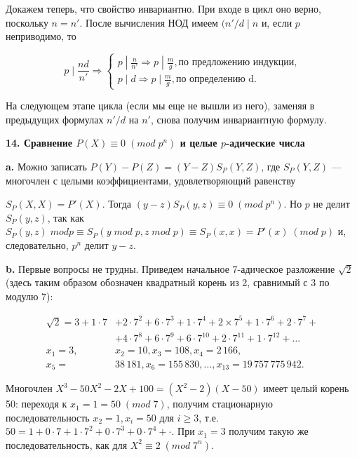 \documentclass{mai_book}
\begin{document}
Докажем теперь, что свойство инвариантно. При входе в цикл оно
верно, поскольку $n=n'$. После вычисления НОД имеем $(n'/d\; |\; n$ и,
если $p$ неприводимо, то

\begin{equation*}
p\;|\; \frac{nd}{n'}\Longrightarrow
 \begin{cases}
   p\;|\; \frac{n}{n'}\Rightarrow p\;|\; \frac{m}{g}, \text{по предложению индукции,}\\
   p\;|\; d\Rightarrow p\;|\; \frac{m}{g}, \text{по определению d.}
 \end{cases}
\end{equation*}


\noindent На следующем этапе цикла (если мы еще не вышли из него), заменяя в
предыдущих формулах $n'/d$ на $n'$, снова получим инвариантную фор­мулу.

\bigskip
\textbf{14. Сравнение $P(X)\equiv 0\; (mod\; p^n)$ и целые $p$-адические числа}

\medskip
\textbf{a.} Можно записать $P(Y)-P(Z)=(Y-Z)S_P(Y,Z)$, где $S_P(Y,Z)$ --- многочлен с целыми коэффициентами, удовлетворяющий равенству

\newpage


\noindent $S_P(X,X)=P'(X)$. Тогда $(y-z)S_P(y,z)\equiv 0\; (mod\; p^n)$. Но $p$ не делит $S_P(y,z)$, так как $S_P(y,z)\; mod p\equiv S_P(y\; mod\; p,z\; mod\; p)\equiv S_P(x,x)=P'(x)\;(mod\; p)$ и, следовательно, $p^n$ делит $y-z$.

\medskip
\textbf{b.} Первые вопросы не трудны. Приведем начальное 7-адическое
разложение $\sqrt{2}$ (здесь таким образом обозначен квадратный корень из 2, сравнимый с 3 по модулю 7):

$$
\begin{aligned}
\sqrt{2}=3+1\cdot 7&+2\cdot 7^2+6\cdot 7^3+1\cdot 7^4+2\times 7^5+1\cdot7^6+2\cdot 7^7+\\
&+4\cdot 7^8+6\cdot 7^9+6\cdot 7^{10}+2\cdot 7^{11}+1\cdot 7^{12}+\dots\\
x_1=3,&x_2=10,x_3=108,x_4=2\,166,\\
x_5=&38\,181,x_6=155\,830,\dots,x_{13}=19\,757\,775\,942.
\end{aligned}
$$

\medskip
Многочлен $X^3-50X^2-2X+100=(X^2-2)(X-50)$ имеет целый
корень 50: переходя к $x_1=1=50\; (mod\; 7)$, получим стационарную
последовательность $x_2=1,x_i=50$ для $i\geq 3$, т.е. $50=1+0\cdot 7+1\cdot 7^2+0\cdot 7^3+0\cdot 7^4+\cdot$. При $x_1=3$ получим такую же последовательность,
как для $X^2\equiv 2\; (mod\; 7^n)$.
\end{document}

